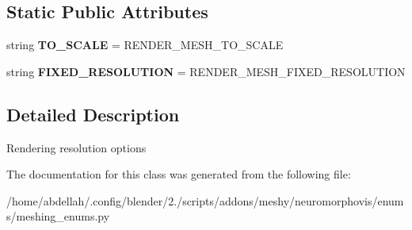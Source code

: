 \subsection*{Static Public Attributes}
\begin{DoxyCompactItemize}
\item 
string {\bfseries T\+O\+\_\+\+S\+C\+A\+LE} = \textquotesingle{}R\+E\+N\+D\+E\+R\+\_\+\+M\+E\+S\+H\+\_\+\+T\+O\+\_\+\+S\+C\+A\+LE\textquotesingle{}\hypertarget{classmeshy_1_1neuromorphovis_1_1enums_1_1meshing__enums_1_1Meshing_1_1Rendering_1_1Resolution_adb44ed706ca2d44ec3f74836c74c20f0}{}\label{classmeshy_1_1neuromorphovis_1_1enums_1_1meshing__enums_1_1Meshing_1_1Rendering_1_1Resolution_adb44ed706ca2d44ec3f74836c74c20f0}

\item 
string {\bfseries F\+I\+X\+E\+D\+\_\+\+R\+E\+S\+O\+L\+U\+T\+I\+ON} = \textquotesingle{}R\+E\+N\+D\+E\+R\+\_\+\+M\+E\+S\+H\+\_\+\+F\+I\+X\+E\+D\+\_\+\+R\+E\+S\+O\+L\+U\+T\+I\+ON\textquotesingle{}\hypertarget{classmeshy_1_1neuromorphovis_1_1enums_1_1meshing__enums_1_1Meshing_1_1Rendering_1_1Resolution_a264982f115fe5408b887528434fe81ff}{}\label{classmeshy_1_1neuromorphovis_1_1enums_1_1meshing__enums_1_1Meshing_1_1Rendering_1_1Resolution_a264982f115fe5408b887528434fe81ff}

\end{DoxyCompactItemize}


\subsection{Detailed Description}


\begin{DoxyVerb}Rendering resolution options
\end{DoxyVerb}
 

The documentation for this class was generated from the following file\+:\begin{DoxyCompactItemize}
\item 
/home/abdellah/.\+config/blender/2./scripts/addons/meshy/neuromorphovis/enums/meshing\+\_\+enums.\+py\end{DoxyCompactItemize}
